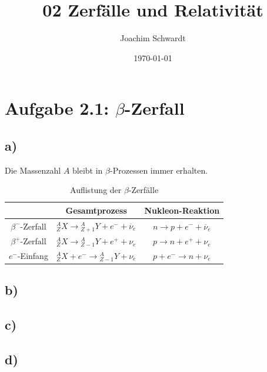 \documentclass[a4paper,12pt]{article}
\begin{document}
\title{02 Zerfälle und Relativität}
\author{Joachim Schwardt}
\date{\today}
\maketitle

\section*{Aufgabe 2.1: $\beta$-Zerfall}
\subsection*{a)}Die Massenzahl $A$ bleibt in $\beta$-Prozessen immer erhalten. 
\begin{table}[h!]
\centering
\begin{tabular}{c|c|c}
&Gesamtprozess&Nukleon-Reaktion\\ \hline
$\beta^-$-Zerfall&${}_Z^AX\longrightarrow {}_{Z+1}^{A}Y+e^-+\overline{\nu}_e$&$n\longrightarrow p+e^-+\overline{\nu}_e$\\ \hline
$\beta^+$-Zerfall&${}_Z^AX\longrightarrow {}_{Z-1}^{A}Y+e^++\nu_e$&$p\longrightarrow n+e^++\nu_e$\\ \hline
$e^-$-Einfang&${}_Z^AX+e^-\longrightarrow {}_{Z-1}^{A}Y+\nu_e$&$p+e^-\longrightarrow n+\nu_e$
\end{tabular}
\caption{Auflistung der $\beta$-Zerfälle}
\label{table:Auflistung beta Zerfaelle}
\end{table}
\subsection*{b)}
\subsection*{c)}
\subsection*{d)}
\end{document}
